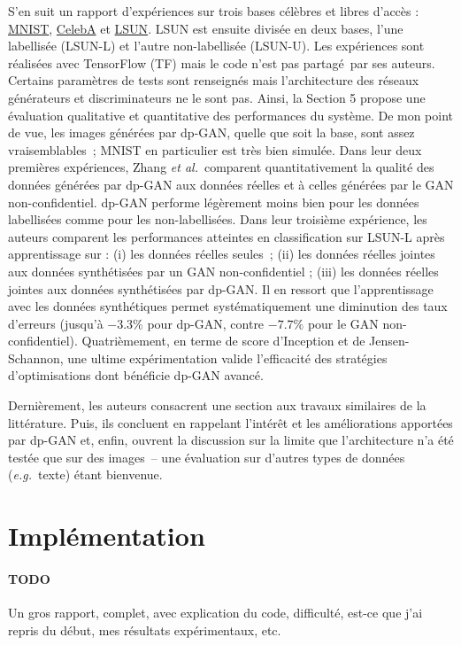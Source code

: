 \documentclass[a4paper,11pt,twoside]{article}
\theoremstyle{definition}
\newcommand{\TODO}[1]{{\color{orange}\sffamily\paragraph{\sffamily TODO} #1\\}}
\newcommand{\eg}{\textit{e.g.}}
\newcommand{\etal}{\textit{et al.}}
\begin{document}
S'en suit un rapport d'expériences sur trois bases célèbres et libres d'accès : \href{http://yann.lecun.com/exdb/mnist/}{MNIST}, \href{http://mmlab.ie.cuhk.edu.hk/projects/CelebA.html}{CelebA} et \href{http://lsun.cs.princeton.edu/2015.html}{LSUN}. LSUN est ensuite divisée en deux bases, l'une labellisée (LSUN-L) et l'autre non-labellisée (LSUN-U). Les expériences sont réalisées avec TensorFlow (TF) mais le code n'est pas partagé par ses auteurs. Certains paramètres de tests sont renseignés mais l'architecture des réseaux générateurs et discriminateurs ne le sont pas. Ainsi, la Section 5 propose une évaluation qualitative et quantitative des performances du système. De mon point de vue, les images générées par dp-GAN, quelle que soit la base, sont assez vraisemblables ; MNIST en particulier est très bien simulée.
Dans leur deux premières expériences, Zhang \etal\ comparent quantitativement la qualité des données générées par dp-GAN aux données réelles et à celles générées par le GAN non-confidentiel. dp-GAN performe légèrement moins bien pour les données labellisées comme pour les non-labellisées. Dans leur troisième expérience, les auteurs comparent les performances atteintes en classification sur LSUN-L après apprentissage sur : (i) les données réelles seules ; (ii) les données réelles jointes aux données synthétisées par un GAN non-confidentiel ; (iii) les données réelles jointes aux données synthétisées par dp-GAN. Il en ressort que l'apprentissage avec les données synthétiques permet systématiquement une diminution des taux d'erreurs (jusqu'à $-3.3 \%$ pour dp-GAN, contre $-7.7 \%$ pour le GAN non-confidentiel). Quatrièmement, en terme de score d'Inception et de Jensen-Schannon, une ultime expérimentation valide l'efficacité des stratégies d'optimisations dont bénéficie dp-GAN avancé.

Dernièrement, les auteurs consacrent une section aux travaux similaires de la littérature. Puis, ils concluent en rappelant l'intérêt et les améliorations apportées par dp-GAN et, enfin, ouvrent la discussion sur la limite que l'architecture n'a été testée que sur des images -- une évaluation sur d'autres types de données (\eg\ texte) étant bienvenue.

\section{Implémentation}
\label{impl}

\TODO{Un gros rapport, complet, avec explication du code, difficulté, est-ce que j'ai repris du début, mes résultats expérimentaux, etc.}
\end{document}
